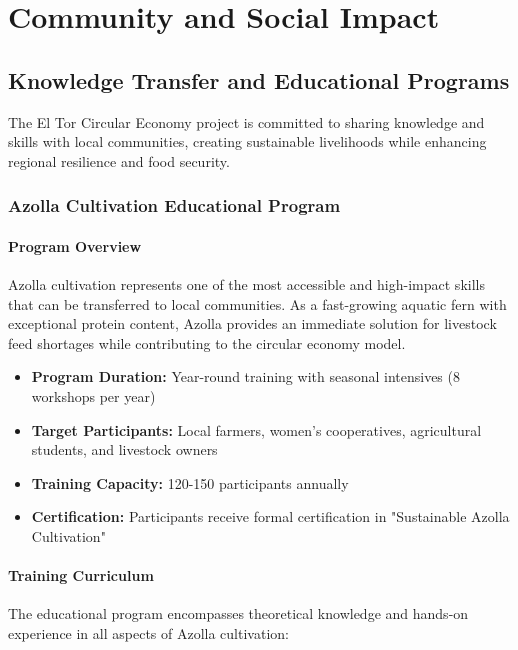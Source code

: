 \section{Community and Social Impact}

\subsection{Knowledge Transfer and Educational Programs}

The El Tor Circular Economy project is committed to sharing knowledge and skills with local communities, creating sustainable livelihoods while enhancing regional resilience and food security.

\subsubsection{Azolla Cultivation Educational Program}

\paragraph{Program Overview}
Azolla cultivation represents one of the most accessible and high-impact skills that can be transferred to local communities. As a fast-growing aquatic fern with exceptional protein content, Azolla provides an immediate solution for livestock feed shortages while contributing to the circular economy model.

\begin{itemize}
    \item \textbf{Program Duration:} Year-round training with seasonal intensives (8 workshops per year)
    \item \textbf{Target Participants:} Local farmers, women's cooperatives, agricultural students, and livestock owners
    \item \textbf{Training Capacity:} 120-150 participants annually
    \item \textbf{Certification:} Participants receive formal certification in "Sustainable Azolla Cultivation"
\end{itemize}

\paragraph{Training Curriculum}
The educational program encompasses theoretical knowledge and hands-on experience in all aspects of Azolla cultivation:

